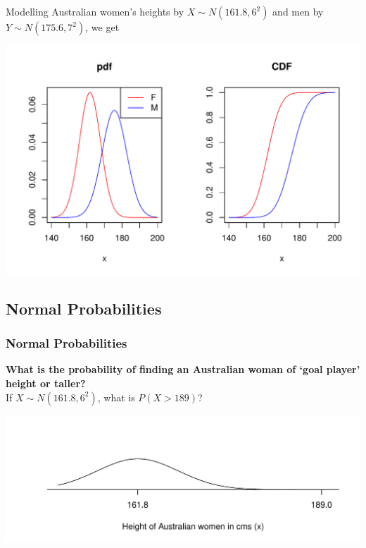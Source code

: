 \documentclass[t,xcolor=pdftex,dvipsnames,table]{beamer}\usepackage[]{graphicx}\usepackage[]{color}
\makeatletter
\def\maxwidth{ %
  \ifdim\Gin@nat@width>\linewidth
    \linewidth
  \else
    \Gin@nat@width
  \fi
}
\newenvironment{knitrout}{}{} %
\makeatother
\begin{document}
\begin{frame}[fragile]

Modelling Australian women's heights by $X \sim N(161.8,6^2)$ and men by $Y \sim N(175.6,7^2)$, we get \\
\href{http://www.abs.gov.au/ausstats/abs@.nsf/0/E11CED5FB86D178ACA257AA30014C059?opendocument
}{}


\begin{knitrout}
\color{fgcolor}
\includegraphics[width=\maxwidth]{figure/unnamed-chunk-81-1} 

\end{knitrout}
\end{frame}


\subsection[Normal Probabilities]{Normal Probabilities}

\begin{frame}[fragile]\frametitle{Normal Probabilities}

{\bf What is the probability of finding an Australian woman of `goal player' height or taller?} \\

\vspace{.5cm}
If $X \sim N(161.8,6^2)$, what is $P(X > 189)$?


\vspace{1cm}
\begin{knitrout}
\color{fgcolor}
\includegraphics[width=\maxwidth]{figure/unnamed-chunk-82-1} 

\end{knitrout}
\end{frame}
\end{document}
